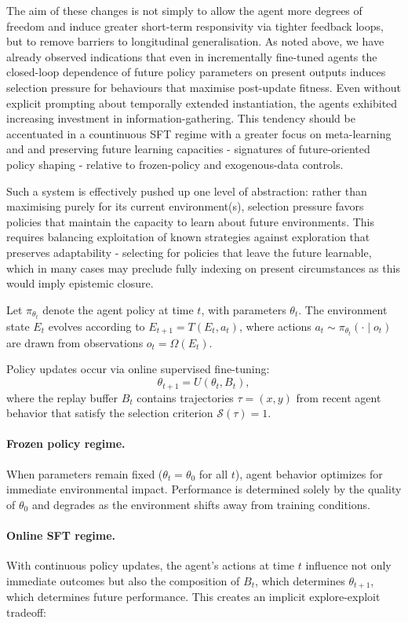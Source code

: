 \documentclass{article}
\begin{document}
The aim of these changes is not simply to allow the agent more degrees of freedom and induce greater short-term responsivity via tighter feedback loops, but to remove barriers to longitudinal generalisation. As noted above, we have already observed indications that even in incrementally fine-tuned agents the closed-loop dependence of future policy parameters on present outputs induces selection pressure for behaviours that maximise post-update fitness. Even without explicit prompting about temporally extended instantiation, the agents exhibited increasing investment in information-gathering. This tendency should be accentuated in a countinuous SFT regime with a greater focus on meta-learning and and preserving future learning capacities - signatures of future-oriented policy shaping - relative to frozen-policy and exogenous-data controls. 

Such a system is effectively pushed up one level of abstraction: rather than maximising purely for its current environment(s), selection pressure favors policies that maintain the capacity to learn about future environments. This requires balancing exploitation of known strategies against exploration that preserves adaptability - selecting for policies that leave the future learnable, which in many cases may preclude fully indexing on present circumstances as this would imply epistemic closure.

Let $\pi_{\theta_t}$ denote the agent policy at time $t$, with parameters $\theta_t$. The environment state $E_t$ evolves according to $E_{t+1} = T(E_t, a_t)$, where actions $a_t \sim \pi_{\theta_t}(\cdot \mid o_t)$ are drawn from observations $o_t = \Omega(E_t)$.

Policy updates occur via online supervised fine-tuning:
\[
\theta_{t+1} = U(\theta_t, B_t),
\]
where the replay buffer $B_t$ contains trajectories $\tau = (x, y)$ from recent agent behavior that satisfy the selection criterion $\mathcal{S}(\tau) = 1$.

\paragraph{Frozen policy regime.}
When parameters remain fixed ($\theta_t = \theta_0$ for all $t$), agent behavior optimizes for immediate environmental impact. Performance is determined solely by the quality of $\theta_0$ and degrades as the environment shifts away from training conditions.

\paragraph{Online SFT regime.}
With continuous policy updates, the agent's actions at time $t$ influence not only immediate outcomes but also the composition of $B_t$, which determines $\theta_{t+1}$, which determines future performance. This creates an implicit explore-exploit tradeoff:
\end{document}
